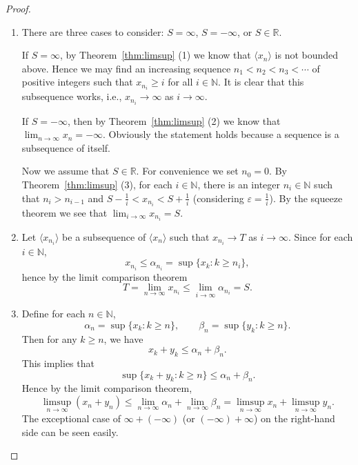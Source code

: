 \begin{proof}
  \begin{enumerate}[(1)]
    \item There are three cases to consider: $S= \infty$, $S = - \infty$, or $S \in \mathbb{R}$.

      If $S = \infty$, by Theorem~\ref{thm:limsup} (1) we know that $\langle x_n \rangle$ is not bounded above.  Hence we may find an increasing sequence $n_1 < n_2 < n_3 < \cdots$ of positive integers such that $x_{n_i} \geqslant i$ for all $i \in \mathbb{N}$.  It is clear that this subsequence works, i.e., $x_{n_i} \to \infty$ as $i \to \infty$.

      If $S = -\infty$, then by Theorem~\ref{thm:limsup} (2) we know that $\displaystyle \lim_{n \to \infty} x_n = -\infty$.  Obviously the statement holds because a sequence is a subsequence of itself.

      Now we assume that $S \in \mathbb{R}$.  For convenience we set $n_0 = 0$.  By Theorem~\ref{thm:limsup} (3), for each $i \in \mathbb{N}$, there is an integer $n_i \in \mathbb{N}$ such that $n_i > n_{i-1}$ and $S - \frac{1}{i} < x_{n_i} < S + \frac{1}{i}$ (considering $\varepsilon = \frac{1}{i}$).  By the squeeze theorem we see that $\displaystyle \lim_{i \to \infty} x_{n_i} = S$.

    \item Let $\langle x_{n_i} \rangle$ be a subsequence of $\langle x_n \rangle$ such that $x_{n_i} \to T$ as $i \to \infty$.  Since for each $i \in \mathbb{N}$,
      \[
	x_{n_i} \leqslant \alpha_{n_i} = \sup \{ x_k \colon k \geqslant n_i \},
      \]
      hence by the limit comparison theorem
      \[
	T = \lim_{n \to \infty} x_{n_i} \leqslant \lim_{i \to \infty} \alpha_{n_i} = S.
      \]

    \item Define for each $n \in \mathbb{N}$,
      \[
	\alpha_n = \sup \{ x_k \colon k \geqslant n \}, \qquad
	\beta_n  = \sup \{ y_k \colon k \geqslant n \}.
      \]
      Then for any $k \geqslant n$, we have
      \[
	x_k + y_k \leqslant \alpha_n + \beta_n.
      \]
      This implies that
      \[
	\sup \{ x_k + y_k \colon k \geqslant n \} \leqslant \alpha_n + \beta_n.
      \]
      Hence by the limit comparison theorem,
      \[
	\limsup_{n \to \infty} (x_n + y_n) \leqslant \lim_{n \to \infty} \alpha_n + \lim_{n \to \infty} \beta_n = \limsup_{n \to \infty} x_n + \limsup_{n \to \infty} y_n.
      \]
      The exceptional case of $\infty + (-\infty)$ (or $(-\infty) + \infty$) on the right-hand side can be seen easily.


\end{enumerate}
\end{proof}
